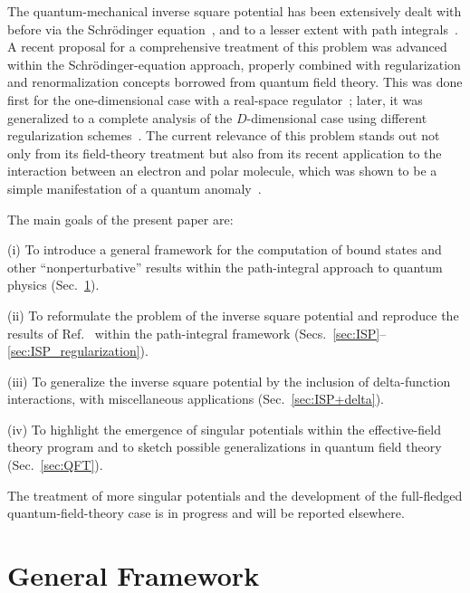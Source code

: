 \documentclass[a4paper,preprint,draft,showpacs,amsmath,amsfonts,amssymb,aps,prd]{revtex4}%
\begin{document}
The quantum-mechanical inverse square potential
has been extensively dealt with before via the
Schr\"{o}dinger equation~\cite{mot:49,gup:93,cam:00,cam:01}, 
and to a lesser extent
with path integrals~\cite{nel:64,pea:69,jar:88,bha:89,gro:98}. 
A recent proposal for a comprehensive treatment of this problem
was advanced within the Schr\"{o}dinger-equation approach, properly
combined with regularization and renormalization concepts 
borrowed from quantum field theory. This was 
done first for the one-dimensional case with a real-space regulator~\cite{gup:93};
later, it was generalized to a complete analysis of the $D$-dimensional case
using different regularization schemes~\cite{cam:00,cam:01}.
The current relevance of this problem stands out
not only from its field-theory treatment but also from its recent application
to the interaction between an electron and polar molecule, which was shown to be
a simple manifestation of a quantum anomaly~\cite{cam:01b}.

The main goals of the present paper are:

(i) To introduce a general framework for the
computation of bound states and other ``nonperturbative'' results
within the path-integral approach to quantum physics
(Sec.~\ref{sec:general_framework}).

(ii) To reformulate the problem of the inverse square potential
and reproduce the results of 
Ref.~\cite{cam:00} within the path-integral framework
(Secs.~\ref{sec:ISP}--\ref{sec:ISP_regularization}).

(iii) To generalize the inverse square potential
by the inclusion of delta-function interactions, with miscellaneous applications
(Sec.~\ref {sec:ISP+delta}).

(iv) To highlight the emergence of singular potentials within the effective-field theory
program 
and to sketch possible generalizations in quantum field theory
(Sec.~\ref{sec:QFT}).

The treatment of more singular potentials and the development of the 
full-fledged quantum-field-theory case is in progress and will be reported 
elsewhere. 



\section{General Framework}
\label{sec:general_framework}
\end{document}
